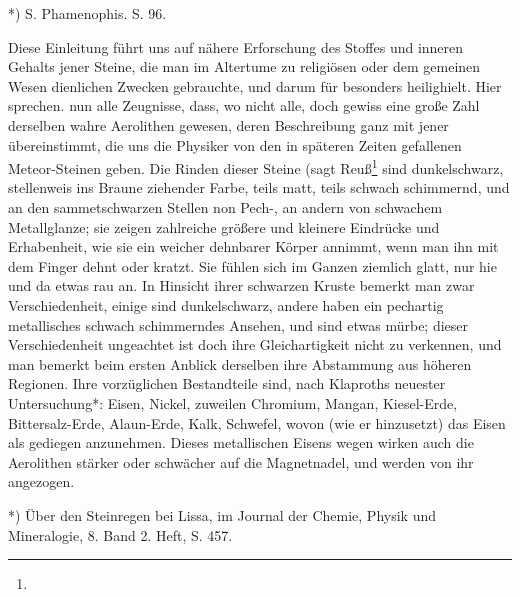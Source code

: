 \documentclass[a4paper, 11pt, oneside, polutonikogreek, german]{article}
\begin{document}
*) S. Phamenophis. S. 96.

Diese Einleitung führt uns auf nähere Erforschung des Stoffes und inneren Gehalts jener Steine, die man im Altertume zu religiösen oder dem gemeinen Wesen dienlichen Zwecken gebrauchte, und darum für besonders heilighielt. Hier sprechen. nun alle Zeugnisse, dass, wo nicht alle, doch gewiss eine große Zahl derselben wahre Aerolithen gewesen, deren Beschreibung ganz mit jener übereinstimmt, die uns die Physiker von den in späteren Zeiten gefallenen Meteor-Steinen geben. Die Rinden dieser Steine (sagt Reuß\footnote{} sind dunkelschwarz, stellenweis ins Braune ziehender Farbe, teils matt, teils schwach schimmernd, und an den sammetschwarzen Stellen non Pech-, an andern von schwachem Metallglanze; sie zeigen zahlreiche größere und kleinere Eindrücke und Erhabenheit, wie sie ein weicher dehnbarer Körper annimmt, wenn man ihn mit dem Finger dehnt oder kratzt. Sie fühlen sich im Ganzen ziemlich glatt, nur hie und da etwas rau an. In Hinsicht ihrer schwarzen Kruste bemerkt man zwar Verschiedenheit, einige sind dunkelschwarz, andere haben ein pechartig metallisches schwach schimmerndes Ansehen, und sind etwas mürbe; dieser Verschiedenheit ungeachtet ist doch ihre Gleichartigkeit nicht zu verkennen, und man bemerkt beim ersten Anblick derselben ihre Abstammung aus höheren Regionen. Ihre vorzüglichen Bestandteile sind, nach Klaproths neuester Untersuchung*: Eisen, Nickel, zuweilen Chromium, Mangan, Kiesel-Erde, Bittersalz-Erde, Alaun-Erde, Kalk, Schwefel, wovon (wie er hinzusetzt) das Eisen als gediegen anzunehmen. Dieses metallischen Eisens wegen wirken auch die Aerolithen stärker oder schwächer auf die Magnetnadel, und werden von ihr angezogen.

*) Über den Steinregen bei Lissa, im Journal der Chemie, Physik und Mineralogie, 8. Band 2. Heft, S. 457.
\end{document}
